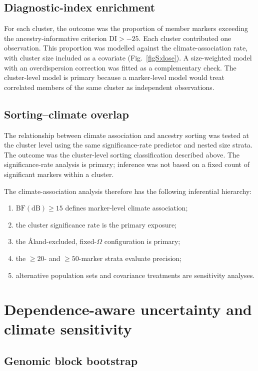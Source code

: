 \documentclass[11pt]{article}
\begin{document}
\subsection{Diagnostic-index enrichment}

For each cluster, the outcome was the proportion of member markers exceeding
the ancestry-informative criterion \(\mathrm{DI}>-25\). Each cluster contributed
one observation. This proportion was modelled against the climate-association
rate, with cluster size included as a covariate (Fig.~\ref{figS:dose}). A
size-weighted model with an
overdispersion correction was fitted as a complementary check. The
cluster-level model is primary because a marker-level model would treat
correlated members of the same cluster as independent observations.

\subsection{Sorting--climate overlap}

The relationship between climate association and ancestry sorting was tested at
the cluster level using the same significance-rate predictor and nested size
strata. The outcome was the cluster-level sorting classification described
above. The significance-rate analysis is primary; inference was not based on a
fixed count of significant markers within a cluster.

The climate-association analysis therefore has the following inferential
hierarchy:
\begin{enumerate}
  \item \(\mathrm{BF(dB)}\geq15\) defines marker-level climate association;
  \item the cluster significance rate is the primary exposure;
  \item the \AA{}land-excluded, fixed-\(\Omega\) configuration is primary;
  \item the \(\geq20\)- and \(\geq50\)-marker strata evaluate precision;
  \item alternative population sets and covariance treatments are sensitivity
        analyses.
\end{enumerate}

\section{Dependence-aware uncertainty and climate sensitivity}

\subsection{Genomic block bootstrap}
\end{document}
